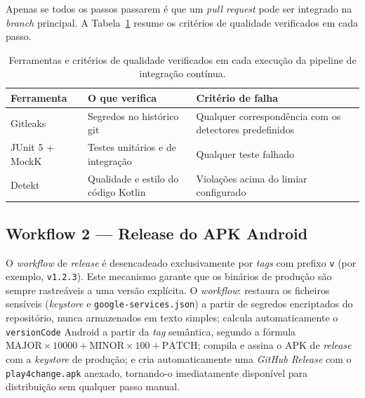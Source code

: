 Apenas se todos os passos passarem é que um \emph{pull request} pode ser integrado na \emph{branch} principal. A Tabela~\ref{tab:ci-gates} resume os critérios de qualidade verificados em cada passo.

\begin{table}[htbp]
	\centering
	\small
	\begin{tabular}{p{2.8cm} p{5.0cm} p{5.0cm}}
		\toprule
		\textbf{Ferramenta} & \textbf{O que verifica} & \textbf{Critério de falha} \\
		\midrule
		Gitleaks            & Segredos no histórico git                    & Qualquer correspondência com os detectores predefinidos \\
		JUnit 5 + MockK     & Testes unitários e de integração             & Qualquer teste falhado \\
		Detekt              & Qualidade e estilo do código Kotlin          & Violações acima do limiar configurado \\
		\bottomrule
	\end{tabular}
	\caption[Critérios de qualidade verificados na pipeline de CI]{Ferramentas e critérios de qualidade verificados em cada execução da pipeline de integração contínua.}
	\label{tab:ci-gates}
\end{table}

\subsection*{Workflow 2 --- Release do APK Android}

\begin{sloppypar}
O \emph{workflow} de \emph{release} é desencadeado exclusivamente por \emph{tags} com prefixo \texttt{v} (por exemplo, \texttt{v1.2.3}). Este mecanismo garante que os binários de produção são sempre rastreáveis a uma versão explícita. O \emph{workflow}: restaura os ficheiros sensíveis (\emph{keystore} e \texttt{google-services.json}) a partir de segredos encriptados do repositório, nunca armazenados em texto simples; calcula automaticamente o \texttt{versionCode} Android a partir da \emph{tag} semântica, segundo a fórmula $\text{MAJOR} \times 10000 + \text{MINOR} \times 100 + \text{PATCH}$; compila e assina o APK de \emph{release} com a \emph{keystore} de produção; e cria automaticamente uma \emph{GitHub Release} com o \texttt{play4change.apk} anexado, tornando-o imediatamente disponível para distribuição sem qualquer passo manual.
\end{sloppypar}

